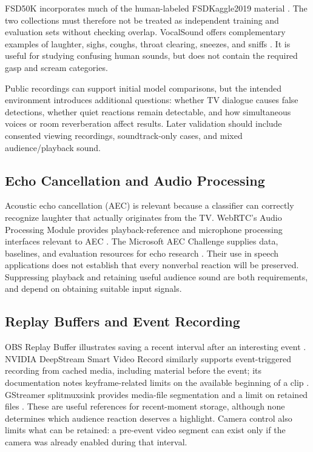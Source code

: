 FSD50K incorporates much of the human-labeled FSDKaggle2019 material \cite{ref15}. The two collections must therefore not be treated as independent training and evaluation sets without checking overlap. VocalSound offers complementary examples of laughter, sighs, coughs, throat clearing, sneezes, and sniffs \cite{ref18}. It is useful for studying confusing human sounds, but does not contain the required gasp and scream categories.

Public recordings can support initial model comparisons, but the intended environment introduces additional questions: whether TV dialogue causes false detections, whether quiet reactions remain detectable, and how simultaneous voices or room reverberation affect results. Later validation should include consented viewing recordings, soundtrack-only cases, and mixed audience/playback sound.

\subsection{Echo Cancellation and Audio Processing}

Acoustic echo cancellation (AEC) is relevant because a classifier can correctly recognize laughter that actually originates from the TV. WebRTC's Audio Processing Module provides playback-reference and microphone processing interfaces relevant to AEC \cite{ref19}. The Microsoft AEC Challenge supplies data, baselines, and evaluation resources for echo research \cite{ref20}. Their use in speech applications does not establish that every nonverbal reaction will be preserved. Suppressing playback and retaining useful audience sound are both requirements, and depend on obtaining suitable input signals.

\subsection{Replay Buffers and Event Recording}

OBS Replay Buffer illustrates saving a recent interval after an interesting event \cite{ref6}. NVIDIA DeepStream Smart Video Record similarly supports event-triggered recording from cached media, including material before the event; its documentation notes keyframe-related limits on the available beginning of a clip \cite{ref21}. GStreamer splitmuxsink provides media-file segmentation and a limit on retained files \cite{ref22}. These are useful references for recent-moment storage, although none determines which audience reaction deserves a highlight. Camera control also limits what can be retained: a pre-event video segment can exist only if the camera was already enabled during that interval.

